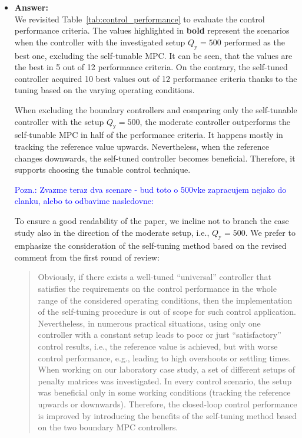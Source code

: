 \documentclass[a4paper,10pt]{article}
\newcommand{\answer}[1]{
	\begin{itemize}
		\item[] \textbf{Answer:}\\ #1
	\end{itemize}
}
\begin{document}
	\answer{		
		We revisited Table~\ref{tab:control_performance} to evaluate the control performance criteria.
		The values highlighted in \textbf{bold} represent the scenarios when the controller with the investigated setup $Q_\mathrm{y} = 500$ performed as the best one, excluding the self-tunable MPC. It can be seen, that the values are the best in 5 out of 12 performance criteria. On the contrary, the self-tuned controller acquired 10 best values out of 12 performance criteria thanks to the tuning based on the varying operating conditions. 
		
		When excluding the boundary controllers and comparing only the self-tunable controller with the setup $Q_\mathrm{y} = 500$, the moderate controller outperforms the self-tunable MPC in half of the performance criteria. It happens mostly in tracking the reference value upwards. Nevertheless, when the reference changes downwards, the self-tuned controller becomes beneficial. Therefore, it supports choosing the tunable control technique. 
		
		\textcolor{blue}{Pozn.: Zvazme teraz dva scenare - bud toto o 500vke zapracujem nejako do clanku, alebo to odbavime nasledovne:}
		
		To ensure a good readability of the paper, we incline not to branch the case study also in the direction of the moderate setup, i.e., $Q_\mathrm{y} = 500$. We prefer to emphasize the consideration of the self-tuning method based on the revised comment from the first round of review:
		
		\begin{quote}
			Obviously, if there exists a well-tuned ``universal'' controller that satisfies the requirements on the control performance in the whole range of the considered operating conditions, then the implementation of the self-tuning procedure is out of scope for such control application. Nevertheless, in numerous practical situations, using only one controller with a constant setup leads to poor or just ``satisfactory'' control results, i.e., the reference value is achieved, but with worse control performance, e.g., leading to high overshoots or settling times. When working on our laboratory case study, a set of different setups of penalty matrices was investigated. In every control scenario, the setup was beneficial only in some working conditions (tracking the reference upwards or downwards). Therefore, the closed-loop control performance is improved by introducing the benefits of the self-tuning method based on the two boundary MPC controllers.
		\end{quote}
		
}
\end{document}
